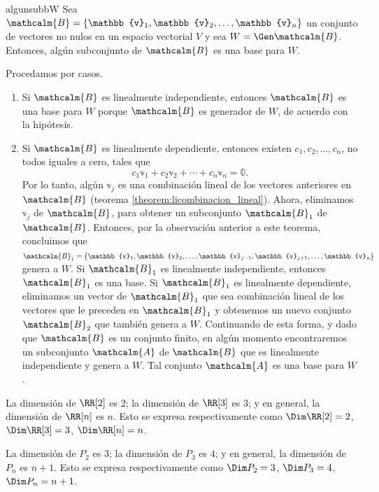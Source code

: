 \begin{theorem}{}{algunsubbW}
    Sea $\mathcalm{B} = \{\mathbb{v}_1, \mathbb{v}_2, \dots, \mathbb{v}_n\}$ un conjunto de vectores no nulos en un espacio vectorial $V$ y sea $W = \Gen \mathcalm{B}$. Entonces, algún subconjunto de $\mathcalm{B}$ es una base para $W$.

    \tcblower
    \demostracion Procedamos por casos.
    \begin{enumerate}[label=\roman*), topsep=6pt, itemsep=0pt]
        \item Si $\mathcalm{B}$ es linealmente independiente, entonces $\mathcalm{B}$ es una base para $W$ porque $\mathcalm{B}$ es generador de $W$, de acuerdo con la hipótesis.
        \item Si $\mathcalm{B}$ es linealmente dependiente, entonces existen $c_1, c_2, \dots, c_n$, no todos iguales a cero, tales que
        $$c_1 \mathbb{v}_1 + c_2 \mathbb{v}_2 + \cdots + c_n \mathbb{v}_n = \mathbb{0}.$$
        Por lo tanto, algún $\mathbb{v}_j$ es una combinación lineal de los vectores anteriores en $\mathcalm{B}$ (teorema \ref{theorem:licombinacion_lineal}). Ahora, eliminamos $\mathbb{v}_j$ de $\mathcalm{B}$, para obtener un subconjunto $\mathcalm{B}_1$ de $\mathcalm{B}$. Entonces, por la observación anterior a este teorema, concluimos que $\mathcalm{B}_1 = \{\mathbb{v}_1, \mathbb{v}_2, \dots, \mathbb{v}_{j-1}, \mathbb{v}_{j+1}, \dots, \mathbb{v}_n\}$ genera a $W$. Si $\mathcalm{B}_1$ es linealmente independiente, entonces $\mathcalm{B}_1$ es una base. Si $\mathcalm{B}_1$ es linealmente dependiente, eliminamos un vector de $\mathcalm{B}_1$ que sea combinación lineal de los vectores que le preceden en $\mathcalm{B}_1$ y obtenemos un nuevo conjunto $\mathcalm{B}_2$ que también genera a $W$. Continuando de esta forma, y dado que $\mathcalm{B}$ es un conjunto finito, en algún momento encontraremos un subconjunto $\mathcalm{A}$ de $\mathcalm{B}$ que es linealmente independiente y genera a $W$. Tal conjunto $\mathcalm{A}$ es una base para $W$.
    \end{enumerate}
\end{theorem}

\begin{examplebox}{}{}
    La dimensión de $\RR[2]$ es $2$; la dimensión de $\RR[3]$ es $3$; y en general, la dimensión de $\RR[n]$ es $n$. Esto se expresa respectivamente como $\Dim \RR[2] = 2$, $\Dim \RR[3] = 3$, $\Dim \RR[n] = n$.
\end{examplebox}

\begin{examplebox}{}{}
    La dimensión de $P_2$ es $3$; la dimensión de $P_3$ es $4$; y en general, la dimensión de $P_n$ es $n + 1$. Esto se expresa respectivamente como $\Dim P_2 = 3$, $\Dim P_3 = 4$, $\Dim P_n = n + 1$.
\end{examplebox}

